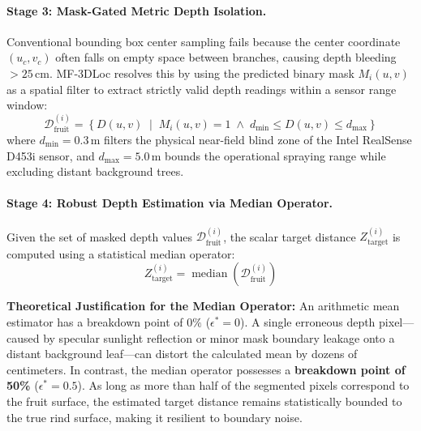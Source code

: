 \documentclass[12pt,a4paper]{article}
\begin{document}
\paragraph{Stage 3: Mask-Gated Metric Depth Isolation.}
Conventional bounding box center sampling fails because the center coordinate $(u_c, v_c)$ often falls on empty space between branches, causing depth bleeding $>25\,\text{cm}$. MF-3DLoc resolves this by using the predicted binary mask $M_i(u, v)$ as a spatial filter to extract strictly valid depth readings within a sensor range window:
\begin{equation}
\mathcal{D}_{\text{fruit}}^{(i)} = \left\{ D(u, v) \;\middle|\; M_i(u, v) = 1 \;\land\; d_{\min} \le D(u, v) \le d_{\max} \right\}
\end{equation}
where $d_{\min} = 0.3\,\text{m}$ filters the physical near-field blind zone of the Intel RealSense D453i sensor, and $d_{\max} = 5.0\,\text{m}$ bounds the operational spraying range while excluding distant background trees.

\paragraph{Stage 4: Robust Depth Estimation via Median Operator.}
Given the set of masked depth values $\mathcal{D}_{\text{fruit}}^{(i)}$, the scalar target distance $Z_{\text{target}}^{(i)}$ is computed using a statistical median operator:
\begin{equation}
Z_{\text{target}}^{(i)} = \operatorname{median}\left(\mathcal{D}_{\text{fruit}}^{(i)}\right)
\label{eq:depth_median}
\end{equation}

\noindent\textbf{Theoretical Justification for the Median Operator:}
An arithmetic mean estimator has a breakdown point of $0\%$ ($\epsilon^* = 0$). A single erroneous depth pixel---caused by specular sunlight reflection or minor mask boundary leakage onto a distant background leaf---can distort the calculated mean by dozens of centimeters. In contrast, the median operator possesses a \textbf{breakdown point of 50\%} ($\epsilon^* = 0.5$). As long as more than half of the segmented pixels correspond to the fruit surface, the estimated target distance remains statistically bounded to the true rind surface, making it resilient to boundary noise.
\end{document}
